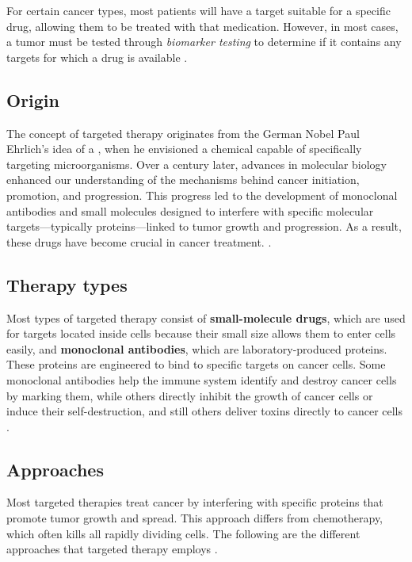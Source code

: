 For certain cancer types, most patients will have a target suitable for a specific drug, allowing them to be treated with that medication. However, in most cases, a tumor must be tested through \textit{biomarker testing} to determine if it contains any targets for which a drug is available \cite{target_therapy1}.

\subsection{Origin}

The concept of targeted therapy originates from the German Nobel Paul Ehrlich's idea of a  \cite{ehrlich}, when he envisioned a chemical capable of specifically targeting microorganisms. Over a century later, advances in molecular biology enhanced our understanding of the mechanisms behind cancer initiation, promotion, and progression. This progress led to the development of monoclonal antibodies and small molecules designed to interfere with specific molecular targets—typically proteins—linked to tumor growth and progression. As a result, these drugs have become crucial in cancer treatment. \cite{se_tt}.

\subsection{Therapy types}

Most types of targeted therapy consist of \textbf{small-molecule drugs}, which are used for targets located inside cells because their small size allows them to enter cells easily, and \textbf{monoclonal antibodies}, which are laboratory-produced proteins. These proteins are engineered to bind to specific targets on cancer cells. Some monoclonal antibodies help the immune system identify and destroy cancer cells by marking them, while others directly inhibit the growth of cancer cells or induce their self-destruction, and still others deliver toxins directly to cancer cells \cite{target_therapy1}. 

\subsection{Approaches}

Most targeted therapies treat cancer by interfering with specific proteins that promote tumor growth and spread. This approach differs from chemotherapy, which often kills all rapidly dividing cells. The following are the different approaches that targeted therapy employs \cite{target_therapy1}.

